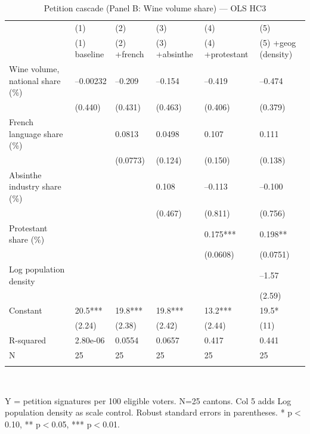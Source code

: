 \begin{table}[tbp] \centering
{}

\caption{Petition cascade (Panel B: Wine volume share) --- OLS HC3}
\label{tab:T4_X2_OLS}
\begin{tabularx}{\linewidth}{@{}lCCCCC@{}}

\toprule
&{(1)}&{(2)}&{(3)}&{(4)}&{(5)} \tabularnewline
 & (1) baseline & (2) +french & (3) +absinthe & (4) +protestant & (5) +geog (density) \tabularnewline 
\midrule \addlinespace[\belowrulesep]
Wine volume, national share (\%)&--0.00232&--0.209&--0.154&--0.419&--0.474 \tabularnewline
&(0.440)&(0.431)&(0.463)&(0.406)&(0.379) \tabularnewline
French language share (\%)&&0.0813&0.0498&0.107&0.111 \tabularnewline
&&(0.0773)&(0.124)&(0.150)&(0.138) \tabularnewline
Absinthe industry share (\%)&&&0.108&--0.113&--0.100 \tabularnewline
&&&(0.467)&(0.811)&(0.756) \tabularnewline
Protestant share (\%)&&&&0.175***&0.198** \tabularnewline
&&&&(0.0608)&(0.0751) \tabularnewline
Log population density&&&&&--1.57 \tabularnewline
&&&&&(2.59) \tabularnewline
Constant&20.5***&19.8***&19.8***&13.2***&19.5* \tabularnewline
&(2.24)&(2.38)&(2.42)&(2.44)&(11) \tabularnewline
\midrule R-squared&2.80e-06&0.0554&0.0657&0.417&0.441 \tabularnewline
N&25&25&25&25&25 \tabularnewline
\bottomrule \addlinespace[\belowrulesep]

\end{tabularx}
\\ \parbox{\linewidth}{\footnotesize Y = petition signatures per 100 eligible voters. N=25 cantons. Col 5 adds Log population density as scale control. Robust standard errors in parentheses. * p\(<\)0.10, ** p\(<\)0.05, *** p\(<\)0.01.}
\end{table}
